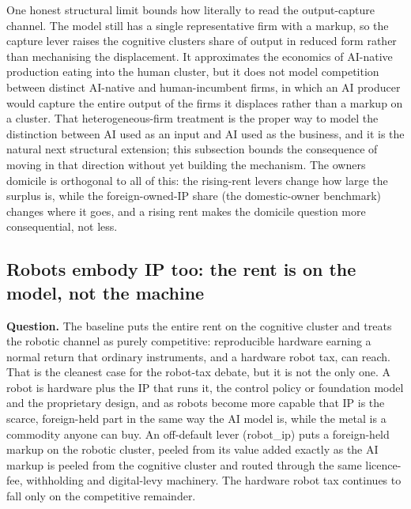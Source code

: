 \documentclass[12pt]{article}
\begin{document}
One honest structural limit bounds how literally to read the
output-capture channel. The model still has a single representative firm
with a markup, so the capture lever raises the cognitive
cluster\textquotesingle s share of output in reduced form rather than
mechanising the displacement. It approximates the economics of AI-native
production eating into the human cluster, but it does not model
competition between distinct AI-native and human-incumbent firms, in
which an AI producer would capture the entire output of the firms it
displaces rather than a markup on a cluster. That heterogeneous-firm
treatment is the proper way to model the distinction between AI used as
an input and AI used as the business, and it is the natural next
structural extension; this subsection bounds the consequence of moving
in that direction without yet building the mechanism. The
owner\textquotesingle s domicile is orthogonal to all of this: the
rising-rent levers change how large the surplus is, while the
foreign-owned-IP share (the domestic-owner benchmark) changes where it
goes, and a rising rent makes the domicile question more consequential,
not less.

\hypertarget{robots-embody-ip-too-the-rent-is-on-the-model-not-the-machine}{%
\subsection{Robots embody IP too: the rent is on the model, not the
machine}\label{robots-embody-ip-too-the-rent-is-on-the-model-not-the-machine}}

\textbf{Question.} The baseline puts the entire rent on the cognitive
cluster and treats the robotic channel as purely competitive:
reproducible hardware earning a normal return that ordinary instruments,
and a hardware robot tax, can reach. That is the cleanest case for the
robot-tax debate, but it is not the only one. A robot is hardware plus
the IP that runs it, the control policy or foundation model and the
proprietary design, and as robots become more capable that IP is the
scarce, foreign-held part in the same way the AI model is, while the
metal is a commodity anyone can buy. An off-default lever (robot\_ip)
puts a foreign-held markup on the robotic cluster, peeled from its value
added exactly as the AI markup is peeled from the cognitive cluster and
routed through the same licence-fee, withholding and digital-levy
machinery. The hardware robot tax continues to fall only on the
competitive remainder.
\end{document}
